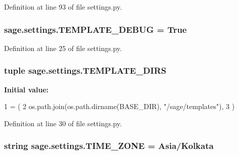Definition at line 93 of file settings.\+py.

\hypertarget{namespacesage_1_1settings_a74c98bee40b9b06d51e44be6df73eb46}{}
\subsubsection[{T\+E\+M\+P\+L\+A\+T\+E\+\_\+\+D\+E\+B\+U\+G}]{\setlength{\rightskip}{0pt plus 5cm}sage.\+settings.\+T\+E\+M\+P\+L\+A\+T\+E\+\_\+\+D\+E\+B\+U\+G = True}\label{namespacesage_1_1settings_a74c98bee40b9b06d51e44be6df73eb46}


Definition at line 25 of file settings.\+py.

\hypertarget{namespacesage_1_1settings_addc90c15790d385d304972f1b3098a86}{}
\subsubsection[{T\+E\+M\+P\+L\+A\+T\+E\+\_\+\+D\+I\+R\+S}]{\setlength{\rightskip}{0pt plus 5cm}tuple sage.\+settings.\+T\+E\+M\+P\+L\+A\+T\+E\+\_\+\+D\+I\+R\+S}\label{namespacesage_1_1settings_addc90c15790d385d304972f1b3098a86}
{\bfseries Initial value\+:}
\begin{DoxyCode}
1 = (
2     os.path.join(os.path.dirname(BASE\_DIR), \textcolor{stringliteral}{"/sage/templates"}),
3 )
\end{DoxyCode}


Definition at line 30 of file settings.\+py.

\hypertarget{namespacesage_1_1settings_a07421ef620becc4c93753901abdf83c0}{}
\subsubsection[{T\+I\+M\+E\+\_\+\+Z\+O\+N\+E}]{\setlength{\rightskip}{0pt plus 5cm}string sage.\+settings.\+T\+I\+M\+E\+\_\+\+Z\+O\+N\+E = \textquotesingle{}Asia/Kolkata\textquotesingle{}}\label{namespacesage_1_1settings_a07421ef620becc4c93753901abdf83c0}


